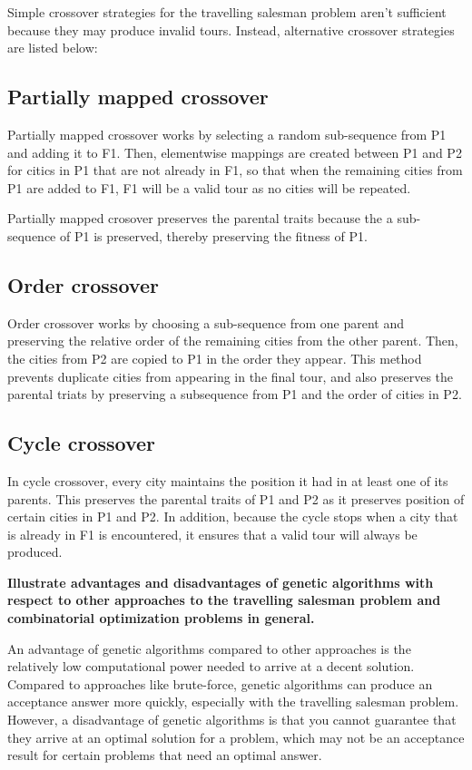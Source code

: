 \documentclass[12pt]{article}
\begin{document}
\medskip

Simple crossover strategies for the travelling salesman problem aren't sufficient because they may produce invalid tours. Instead, alternative crossover strategies are listed below:

\subsection*{Partially mapped crossover}

Partially mapped crossover works by selecting a random sub-sequence from P1 and adding it to F1. Then, elementwise mappings are created between P1 and P2 for citics in P1 that are not already in F1, so that when the remaining cities from P1 are added to F1, F1 will be a valid tour as no cities will be repeated.

Partially mapped crosover preserves the parental traits because the a sub-sequence of P1 is preserved, thereby preserving the fitness of P1.

\subsection*{Order crossover}

Order crossover works by choosing a sub-sequence from one parent and preserving the relative order of the remaining cities from the other parent. Then, the cities from P2 are copied to P1 in the order they appear. This method prevents duplicate cities from appearing in the final tour, and also preserves the parental triats by preserving a subsequence from P1 and the order of cities in P2.

\subsection*{Cycle crossover}

In cycle crossover, every city maintains the position it had in at least one of its parents. This preserves the parental traits of P1 and P2 as it preserves position of certain cities in P1 and P2. In addition, because the cycle stops when a city that is already in F1 is encountered, it ensures that a valid tour will always be produced.

\bigskip

\textbf{Illustrate advantages and disadvantages of genetic algorithms with respect to other approaches to the travelling salesman problem and combinatorial optimization problems in general.}

\medskip

An advantage of genetic algorithms compared to other approaches is the relatively low computational power needed to arrive at a decent solution. Compared to approaches like brute-force, genetic algorithms can produce an acceptance answer more quickly, especially with the travelling salesman problem. However, a disadvantage of genetic algorithms is that you cannot guarantee that they arrive at an optimal solution for a problem, which may not be an acceptance result for certain problems that need an optimal answer.
\end{document}
